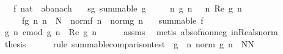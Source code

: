 \begin{isabellebody}
\ \ \ f{\isacharcolon}{\kern0pt}{\isacharcolon}{\kern0pt}\ {\isachardoublequoteopen}nat\ {\isasymRightarrow}\ {\isacharprime}{\kern0pt}a{\isacharcolon}{\kern0pt}{\isacharcolon}{\kern0pt}banach{\isachardoublequoteclose}\isanewline
\ \ \ sg{\isacharcolon}{\kern0pt}\ {\isachardoublequoteopen}summable\ g{\isachardoublequoteclose}\isanewline
\ \ \ \ \ {\isachardoublequoteopen}{\isasymAnd}n{\isachardot}{\kern0pt}\ g\ n\ {\isasymin}\ {\isasymreal}{\isachardoublequoteclose}\ {\isachardoublequoteopen}{\isasymAnd}n{\isachardot}{\kern0pt}\ Re\ {\isacharparenleft}{\kern0pt}g\ n{\isacharparenright}{\kern0pt}\ {\isasymge}\ {}{\isachardoublequoteclose}\isanewline
\ \ \ \ \ fg{\isacharcolon}{\kern0pt}\ {\isachardoublequoteopen}{\isasymAnd}n{\isachardot}{\kern0pt}\ n\ {\isasymge}\ N\ {\isasymLongrightarrow}\ norm{\isacharparenleft}{\kern0pt}f\ n{\isacharparenright}{\kern0pt}\ {\isasymle}\ norm{\isacharparenleft}{\kern0pt}g\ n{\isacharparenright}{\kern0pt}{\isachardoublequoteclose}\isanewline
\ \ \ {\isachardoublequoteopen}summable\ f{\isachardoublequoteclose}\isanewline
%
\isadelimproof
%
\endisadelimproof
%
\isatagproof
{}\isamarkupfalse%
\ {\isacharminus}{\kern0pt}\isanewline
\ \ \isamarkupfalse%
\ g{\isacharcolon}{\kern0pt}\ {\isachardoublequoteopen}{\isasymAnd}n{\isachardot}{\kern0pt}\ cmod\ {\isacharparenleft}{\kern0pt}g\ n{\isacharparenright}{\kern0pt}\ {\isacharequal}{\kern0pt}\ Re\ {\isacharparenleft}{\kern0pt}g\ n{\isacharparenright}{\kern0pt}{\isachardoublequoteclose}\isanewline
\ \ \ \ \isamarkupfalse%
\ assms\ \isamarkupfalse%
\ {\isacharparenleft}{\kern0pt}metis\ abs{\isacharunderscore}{\kern0pt}of{\isacharunderscore}{\kern0pt}nonneg\ in{\isacharunderscore}{\kern0pt}Reals{\isacharunderscore}{\kern0pt}norm{\isacharparenright}{\kern0pt}\isanewline
\ \ \isamarkupfalse%
\ {\isacharquery}{\kern0pt}thesis\isanewline
\ \ \ \ \isamarkupfalse%
\ {\isacharparenleft}{\kern0pt}rule\ summable{\isacharunderscore}{\kern0pt}comparison{\isacharunderscore}{\kern0pt}test{\isacharprime}{\kern0pt}\ {\isacharbrackleft}{\kern0pt}\ g\ {\isacharequal}{\kern0pt}\ {\isachardoublequoteopen}{\isasymlambda}n{\isachardot}{\kern0pt}\ norm\ {\isacharparenleft}{\kern0pt}g\ n{\isacharparenright}{\kern0pt}{\isachardoublequoteclose}\ \ N{\isacharequal}{\kern0pt}N{\isacharbrackright}{\kern0pt}{\isacharparenright}{\kern0pt}\isanewline
\ \ \ \ \isamarkupfalse%

\end{isabellebody}
